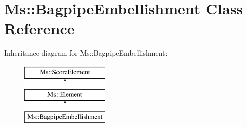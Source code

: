 \hypertarget{class_ms_1_1_bagpipe_embellishment}{}\section{Ms\+:\+:Bagpipe\+Embellishment Class Reference}
\label{class_ms_1_1_bagpipe_embellishment}
Inheritance diagram for Ms\+:\+:Bagpipe\+Embellishment\+:\begin{figure}[H]
\begin{center}
\leavevmode
\includegraphics[height=3.000000cm]{class_ms_1_1_bagpipe_embellishment}
\end{center}
\end{figure}
